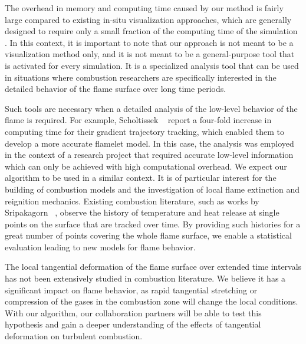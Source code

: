 %
The overhead in memory and computing time caused by our method is fairly large
compared to existing in-situ visualization approaches, which are generally
designed to require only a small fraction of the computing time of the
simulation \cite{Ma2009}.
%
In this context, it is important to note that our approach is not meant to be a
visualization method only, and it is not meant to be a general-purpose tool that
is activated for every simulation.
%
It is a specialized analysis tool that can be used in situations where
combustion researchers are specifically interested in the detailed behavior of
the flame surface over long time periods.
%

%
Such tools are necessary when a detailed analysis of the low-level behavior
of the flame is required.
%
For example, Scholtissek \etal{}~\cite{Scholtissek2017} report a four-fold
increase in computing time for their gradient trajectory tracking, which enabled
them to develop a more accurate flamelet model.
%
In this case, the analysis was employed in the context of a research project
that required accurate low-level information which can only be achieved with
high computational overhead.
%
We expect our algorithm to be used in a similar context.
%
It is of particular interest for the building of combustion models and the
investigation of local flame extinction and reignition mechanics.
%
Existing combustion literature, such as works by Sripakagorn
\etal{}~\cite{Sripakagorn2004}, observe the history of temperature and heat
release at single points on the surface that are tracked over time.
%
By providing such histories for a great number of points covering the whole
flame surface, we enable a statistical evaluation leading to new models for
flame behavior.
%

%
The local tangential deformation of the flame surface over extended time
intervals has not been extensively studied in combustion literature.
%
We believe it has a significant impact on flame behavior, as rapid tangential
stretching or compression of the gases in the combustion zone will change the
local conditions.
%
With our algorithm, our collaboration partners will be able to test this
hypothesis and gain a deeper understanding of the effects of tangential
deformation on turbulent combustion.
%
